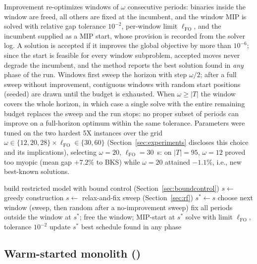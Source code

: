 Improvement re-optimizes windows of $\omega$ consecutive periods:
binaries inside the window are freed, all others are fixed at the
incumbent, and the window MIP is solved with relative gap tolerance
$10^{-2}$, per-window limit $\ell_{\mathrm{FO}}$, and the incumbent
supplied as a MIP start, whose provision is recorded from the solver
log. A solution is accepted if it improves the global objective by
more than $10^{-6}$; since the start is feasible for every window
subproblem, accepted moves never degrade the incumbent, and the
method reports the best solution found in \emph{any} phase of the
run. Windows first sweep the horizon with step $\omega/2$; after a
full sweep without improvement, contiguous windows with random start
positions (seeded) are drawn until the budget is exhausted. When
$\omega\ge|T|$ the window covers the whole horizon, in which case a
single solve with the entire remaining budget replaces the sweep and
the run stops: no proper subset of periods can improve on a
full-horizon optimum within the same tolerance.
Parameters were tuned on the two hardest 5X instances over the grid
$\omega\in\{12,20,28\}\times\ell_{\mathrm{FO}}\in\{30,60\}$
(Section~\ref{sec:experiments} discloses this choice and its
implications), selecting $\omega=20$, $\ell_{\mathrm{FO}}=30$~s: on
$|T|=95$, $\omega=12$ proved too myopic (mean gap $+7.2\%$ to BKS)
while $\omega=20$ attained $-1.1\%$, i.e., new best-known solutions.

\begin{algorithm}[t]
\caption{\RFFO{} (sketch; \RFMIP{} replaces lines 6--9 by one
warm-started solve of the full model)}
\label{alg:rffo}
\begin{algorithmic}[1]
\State build restricted model with bound control
(Section~\ref{sec:boundcontrol})
 $s \gets$ greedy construction
\Else{} $s \gets$ relax-and-fix sweep (Section~\ref{sec:rf})
\EndIf
\State $s^\ast \gets s$
  \State choose next window (sweep, then random after a
  no-improvement sweep)
  \State fix all periods outside the window at $s^\ast$; free the
  window; MIP-start at $s^\ast$
  \State solve with limit $\ell_{\mathrm{FO}}$, tolerance $10^{-2}$
   update $s^\ast$ \EndIf
\EndWhile
\State \Return best schedule found in any phase
\end{algorithmic}
\end{algorithm}

\subsection{Warm-started monolith (\RFMIP)}
\label{sec:rfmip}

